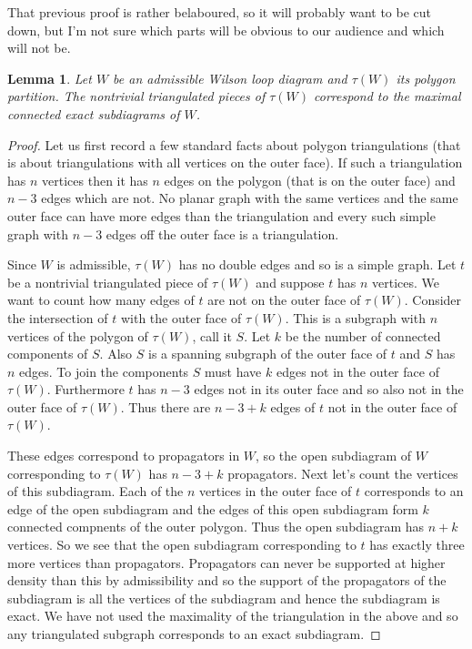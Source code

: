 \documentclass[11pt]{article}
\newtheorem{lem}[thm]{Lemma}
\theoremstyle{remark}
\theoremstyle{definition}
\begin{document}
That previous proof is rather belaboured, so it will probably want to be cut down, but I'm not sure which parts will be obvious to our audience and which will not be.

\begin{lem}\label{lem triang to exact}
  Let $W$ be an admissible Wilson loop diagram and $\tau(W)$ its polygon partition.  The nontrivial triangulated pieces of $\tau(W)$ correspond to the maximal connected exact subdiagrams of $W$.
\end{lem}

\begin{proof}
  Let us first record a few standard facts about polygon triangulations (that is about triangulations with all vertices on the outer face).  If such a triangulation has $n$ vertices then it has $n$ edges on the polygon (that is on the outer face) and $n-3$ edges which are not.  No planar graph with the same vertices and the same outer face can have more edges than the triangulation and every such simple graph with $n-3$ edges off the outer face is a triangulation.


  Since $W$ is admissible, $\tau(W)$ has no double edges and so is a simple graph.
  Let $t$ be a nontrivial triangulated piece of $\tau(W)$ and suppose $t$ has $n$ vertices.  We want to count how many edges of $t$ are not on the outer face of $\tau(W)$.  Consider the intersection of $t$ with the outer face of $\tau(W)$.  This is a subgraph with $n$ vertices of the polygon of $\tau(W)$, call it $S$.  Let $k$ be the number of connected components of $S$.  Also $S$ is a spanning subgraph of the outer face of $t$ and $S$ has $n$ edges.  To join the components $S$ must have $k$ edges not in the outer face of $\tau(W)$.  Furthermore $t$ has $n-3$ edges not in its outer face and so also not in the outer face of $\tau(W)$.  Thus there are $n-3+k$ edges of $t$ not in the outer face of $\tau(W)$.

  These edges correspond to propagators in $W$, so the open subdiagram of $W$ corresponding to $\tau(W)$ has $n-3+k$ propagators.  Next let's count the vertices of this subdiagram.  Each of the $n$ vertices in the outer face of $t$ corresponds to an edge of the open subdiagram and the edges of this open subdiagram form $k$ connected compnents of the outer polygon.  Thus the open subdiagram has $n+k$ vertices.  So we see that the open subdiagram corresponding to $t$ has exactly three more vertices than propagators.  Propagators can never be supported at higher density than this by admissibility and so the support of the propagators of the subdiagram is all the vertices of the subdiagram and hence the subdiagram is exact.  We have not used the maximality of the triangulation in the above and so any triangulated subgraph corresponds to an exact subdiagram.


\end{proof}
\end{document}
